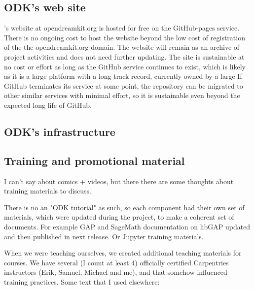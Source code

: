 \documentclass{deliverablereport}
\begin{document}
\subsection{ODK's web site}

\ODK's website at opendreamkit.org is hosted for free on the GitHub-pages service.
There is no ongoing cost to host the website beyond the low cost of registration of the the opendreamkit.org domain.
The \ODK website will remain as an archive of project activities and does not need further updating.
The site is sustainable at no cost or effort as long as the GitHub service continues to exist,
which is likely as it is a large platform with a long track record, currently owned by a large
If GitHub terminates its service at some point,
the repository can be migrated to other similar services with minimal effort,
so it is sustainable even beyond the expected long life of GitHub.


\subsection{ODK's infrastructure}


\subsection{Training and promotional material}

I can't say about comics + videos, but there there are some thoughts about training materials to discuss.

There is no an "ODK tutorial" as such, so each component had their own set of materials, which were updated during the project, to make a coherent set of documents. For example GAP and SageMath documentation on libGAP updated and then published in next release. Or Jupyter training materials. 

When we were teaching ourselves, we created additional teaching materials for courses. We have several (I count at least 4) officially certified Carpentries instructors (Erik, Samuel, Michael and me), and that somehow influenced training practices. Some text that I used elsewhere:
\end{document}
